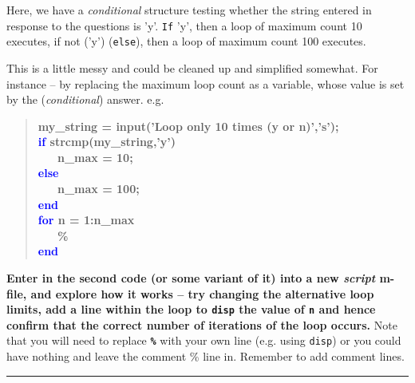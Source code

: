 \documentclass{tufte-book} %
\newenvironment{docspecbold}{\begin{quotation}\ttfamily\bfseries\parskip0pt\parindent0pt\ignorespaces}{\end{quotation}}
\begin{document}
Here, we have a \textit{conditional} structure testing whether the string entered in response to the questions is 'y'. \texttt{If} 'y', then a loop of maximum count 10 executes, if not ('y') (\texttt{else}), then a loop of maximum count 100 executes.

This is a little messy and could be cleaned up and simplified somewhat. For instance -- by replacing the maximum loop count as a variable, whose value is set by the (\textit{conditional}) answer. e.g.

\begin{docspecbold}
my\_string = input('Loop only 10 times (y or n)','s');
\\ \textcolor{blue}{if} strcmp(my\_string,'y')
\\ \ \ \ n\_max = 10;
\\ \textcolor{blue}{else}
\\ \ \ \ n\_max = 100;
\\ \textcolor{blue}{end}
\\ \textcolor{blue}{for} n = 1:n\_max
\\ \ \ \ \textcolor[rgb]{0,0.501961,0}{\%}
\\ \textcolor{blue}{end}
\end{docspecbold}

\textbf{Enter in the second code (or some variant of it) into a new \textit{script} m-file, and explore how it works -- try changing the alternative loop limits, add a line within the loop to \texttt{disp} the value of \texttt{n} and hence confirm that the correct number of iterations of the loop occurs.} Note that you will need to replace \texttt{\textbf{\textcolor[rgb]{0,0.501961,0}{\%}}} with your own line (e.g. using \texttt{disp}) or you could have nothing and leave the comment \textcolor[rgb]{0,0.501961,0}{\%} line in. Remember to add comment lines.

\vspace{1mm}
\noindent\rule{4cm}{0.5pt}
\vspace{2mm}
\end{document}

